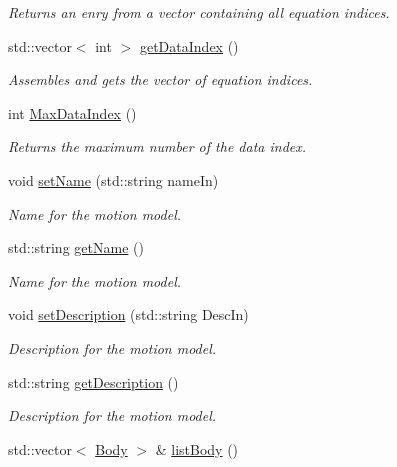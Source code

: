 \begin{DoxyCompactItemize}
\begin{DoxyCompactList}\small\item\em Returns an enry from a vector containing all equation indices. \end{DoxyCompactList}\item 
std\-::vector$<$ int $>$ \hyperlink{classosea_1_1ofreq_1_1_motion_model_a19f38af161556e9e5b79cdf6a4ff39bb}{get\-Data\-Index} ()
\begin{DoxyCompactList}\small\item\em Assembles and gets the vector of equation indices. \end{DoxyCompactList}\item 
int \hyperlink{classosea_1_1ofreq_1_1_motion_model_a81ed21162a09ffce06043f3a7fb4213d}{Max\-Data\-Index} ()
\begin{DoxyCompactList}\small\item\em Returns the maximum number of the data index. \end{DoxyCompactList}\item 
void \hyperlink{classosea_1_1ofreq_1_1_motion_model_a42d989727028c18c59ba04f958bc7b74}{set\-Name} (std\-::string name\-In)
\begin{DoxyCompactList}\small\item\em Name for the motion model. \end{DoxyCompactList}\item 
std\-::string \hyperlink{classosea_1_1ofreq_1_1_motion_model_af9fd1e58735b7f47bc5d5257bdca9139}{get\-Name} ()
\begin{DoxyCompactList}\small\item\em Name for the motion model. \end{DoxyCompactList}\item 
void \hyperlink{classosea_1_1ofreq_1_1_motion_model_a5097540bb98ad753594d41890e6ef30d}{set\-Description} (std\-::string Desc\-In)
\begin{DoxyCompactList}\small\item\em Description for the motion model. \end{DoxyCompactList}\item 
std\-::string \hyperlink{classosea_1_1ofreq_1_1_motion_model_a8594356137407b25d03927a68a422dc9}{get\-Description} ()
\begin{DoxyCompactList}\small\item\em Description for the motion model. \end{DoxyCompactList}\item 
std\-::vector$<$ \hyperlink{classosea_1_1ofreq_1_1_body}{Body} $>$ \& \hyperlink{classosea_1_1ofreq_1_1_motion_model_a67ad0e6b993a20af61170cdebe8f418f}{list\-Body} ()

\end{DoxyCompactItemize}
